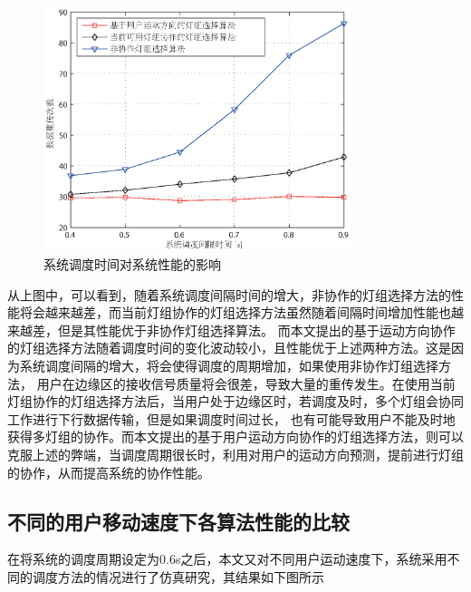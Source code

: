 \begin{figure}[htbp]
    \centering
	\includegraphics[width=0.8\textwidth]{figures/chapter-4/DistributionSchTime.eps}
	\caption{系统调度时间对系统性能的影响}
	\label{fig:distribution-sch-time}
\end{figure}

从上图中，可以看到，随着系统调度间隔时间的增大，非协作的灯组选择方法的性能将会越来越差，而当前灯组协作的灯组选择方法虽然随着间隔时间增加性能也越来越差，但是其性能优于非协作灯组选择算法。
而本文提出的基于运动方向协作的灯组选择方法随着调度时间的变化波动较小，且性能优于上述两种方法。这是因为系统调度间隔的增大，将会使得调度的周期增加，如果使用非协作灯组选择方法，
用户在边缘区的接收信号质量将会很差，导致大量的重传发生。在使用当前灯组协作的灯组选择方法后，当用户处于边缘区时，若调度及时，多个灯组会协同工作进行下行数据传输，但是如果调度时间过长，
也有可能导致用户不能及时地获得多灯组的协作。而本文提出的基于用户运动方向协作的灯组选择方法，则可以克服上述的弊端，当调度周期很长时，利用对用户的运动方向预测，提前进行灯组的协作，从而提高系统的协作性能。

\subsection{不同的用户移动速度下各算法性能的比较}
在将系统的调度周期设定为0.6s之后，本文又对不同用户运动速度下，系统采用不同的调度方法的情况进行了仿真研究，其结果如下图所示

